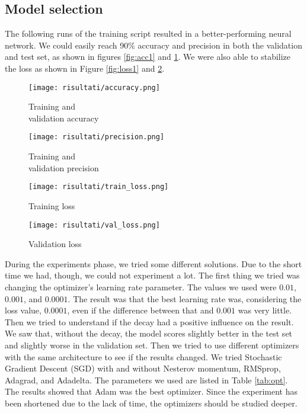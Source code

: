 	\subsection{Model selection}
	
		The following runs of the training script resulted in a better-performing neural network. 
		We could easily reach 90\% accuracy and precision in both the validation and test set, as shown in figures \ref{fig:acc1} and \ref{fig:acc2}.
		We were also able to stabilize the loss as shown in Figure \ref{fig:loss1} and \ref{fig:loss2}.
		
		\begin{figure}[!h]
			\centering
			\begin{minipage}{.5\textwidth}
				\centering
				\texttt{[image: risultati/accuracy.png]}
				\caption{\label{fig:acc1}Training and \\ validation accuracy}
			\end{minipage}%
			\begin{minipage}{.5\textwidth}
				\centering
				\texttt{[image: risultati/precision.png]}
				\caption{\label{fig:acc2}Training and \\ validation precision}
			\end{minipage}
		\end{figure}
		
		\begin{figure}[!h]
			\centering
			\begin{minipage}{.5\textwidth}
				\centering
				\texttt{[image: risultati/train\_loss.png]}
				\caption{\label{fig:loss1}Training loss}
			\end{minipage}%
			\begin{minipage}{.5\textwidth}
				\centering
				\texttt{[image: risultati/val\_loss.png]}
				\caption{\label{fig:loss2}Validation loss}
			\end{minipage}
		\end{figure}
		
		During the experiments phase, we tried some different solutions. 
		Due to the short time we had, though, we could not experiment a lot. 
		The first thing we tried was changing the optimizer's learning rate parameter. 
		The values we used were $0.01$, $0.001$, and $0.0001$. 
		The result was that the best learning rate was, considering the loss value, $0.0001$, even if the difference between that and $0.001$ was very little. 
		Then we tried to understand if the decay had a positive influence on the result. 
		We saw that, without the decay, the model scores slightly better in the test set and slightly worse in the validation set. 
		Then we tried to use different optimizers with the same architecture to see if the results changed. 
		We tried Stochastic Gradient Descent (SGD) with and without Nesterov momentum, RMSprop, Adagrad, and Adadelta. 
		The parameters we used are listed in Table \ref{tab:opt}. 
		The results showed that Adam was the best optimizer. 
		Since the experiment has been shortened due to the lack of time, the optimizers should be studied deeper.
		

